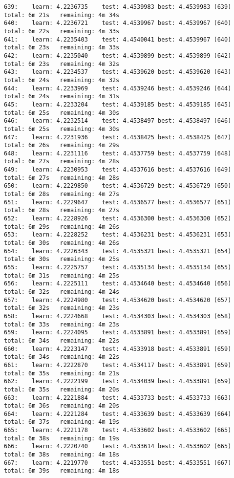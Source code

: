 \documentclass[11pt]{article}
\begin{document}
\begin{Verbatim}[commandchars=\\\{\}]
639:	learn: 4.2236735	test: 4.4539983	best: 4.4539983 (639)	total: 6m 21s	remaining: 4m 34s
640:	learn: 4.2236721	test: 4.4539967	best: 4.4539967 (640)	total: 6m 22s	remaining: 4m 33s
641:	learn: 4.2235403	test: 4.4540041	best: 4.4539967 (640)	total: 6m 23s	remaining: 4m 33s
642:	learn: 4.2235040	test: 4.4539899	best: 4.4539899 (642)	total: 6m 23s	remaining: 4m 32s
643:	learn: 4.2234537	test: 4.4539620	best: 4.4539620 (643)	total: 6m 24s	remaining: 4m 32s
644:	learn: 4.2233969	test: 4.4539246	best: 4.4539246 (644)	total: 6m 24s	remaining: 4m 31s
645:	learn: 4.2233204	test: 4.4539185	best: 4.4539185 (645)	total: 6m 25s	remaining: 4m 30s
646:	learn: 4.2232514	test: 4.4538497	best: 4.4538497 (646)	total: 6m 25s	remaining: 4m 30s
647:	learn: 4.2231936	test: 4.4538425	best: 4.4538425 (647)	total: 6m 26s	remaining: 4m 29s
648:	learn: 4.2231116	test: 4.4537759	best: 4.4537759 (648)	total: 6m 27s	remaining: 4m 28s
649:	learn: 4.2230953	test: 4.4537616	best: 4.4537616 (649)	total: 6m 27s	remaining: 4m 28s
650:	learn: 4.2229850	test: 4.4536729	best: 4.4536729 (650)	total: 6m 28s	remaining: 4m 27s
651:	learn: 4.2229647	test: 4.4536577	best: 4.4536577 (651)	total: 6m 28s	remaining: 4m 27s
652:	learn: 4.2228926	test: 4.4536300	best: 4.4536300 (652)	total: 6m 29s	remaining: 4m 26s
653:	learn: 4.2228252	test: 4.4536231	best: 4.4536231 (653)	total: 6m 30s	remaining: 4m 26s
654:	learn: 4.2226343	test: 4.4535321	best: 4.4535321 (654)	total: 6m 30s	remaining: 4m 25s
655:	learn: 4.2225757	test: 4.4535134	best: 4.4535134 (655)	total: 6m 31s	remaining: 4m 25s
656:	learn: 4.2225111	test: 4.4534640	best: 4.4534640 (656)	total: 6m 32s	remaining: 4m 24s
657:	learn: 4.2224980	test: 4.4534620	best: 4.4534620 (657)	total: 6m 32s	remaining: 4m 23s
658:	learn: 4.2224668	test: 4.4534303	best: 4.4534303 (658)	total: 6m 33s	remaining: 4m 23s
659:	learn: 4.2224095	test: 4.4533891	best: 4.4533891 (659)	total: 6m 34s	remaining: 4m 22s
660:	learn: 4.2223147	test: 4.4533918	best: 4.4533891 (659)	total: 6m 34s	remaining: 4m 22s
661:	learn: 4.2222870	test: 4.4534117	best: 4.4533891 (659)	total: 6m 35s	remaining: 4m 21s
662:	learn: 4.2222199	test: 4.4534039	best: 4.4533891 (659)	total: 6m 35s	remaining: 4m 20s
663:	learn: 4.2221884	test: 4.4533733	best: 4.4533733 (663)	total: 6m 36s	remaining: 4m 20s
664:	learn: 4.2221284	test: 4.4533639	best: 4.4533639 (664)	total: 6m 37s	remaining: 4m 19s
665:	learn: 4.2221178	test: 4.4533602	best: 4.4533602 (665)	total: 6m 38s	remaining: 4m 19s
666:	learn: 4.2220740	test: 4.4533614	best: 4.4533602 (665)	total: 6m 38s	remaining: 4m 18s
667:	learn: 4.2219770	test: 4.4533551	best: 4.4533551 (667)	total: 6m 39s	remaining: 4m 18s

\end{Verbatim}
\end{document}
